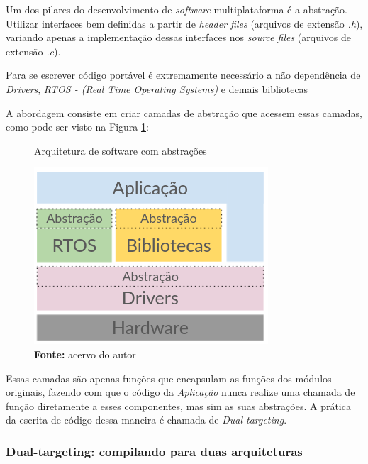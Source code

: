 \documentclass[times, twoside, watermark]{artigo}
\begin{document}
Um dos pilares do desenvolvimento de \textit{software} multiplataforma é a abstração.
Utilizar interfaces bem definidas a partir de \textit{header files} (arquivos de
extensão \textit{.h}), variando apenas a implementação dessas interfaces nos
\textit{source files} (arquivos de extensão \textit{.c}).

Para se escrever código portável é extremamente necessário a não dependência de
\textit{Drivers}, \textit{RTOS - (Real Time Operating Systems)} e demais bibliotecas

A abordagem consiste em criar camadas de abstração que acessem essas camadas, como
pode ser visto na Figura \ref{fig:arch-abs}: \hfill\\

\begin{figure}[H]
  \centering
  \caption{Arquitetura de software com abstrações}
  \includegraphics[width=0.9\linewidth]{images/arch-abs.png}
  \caption*{\newline\textbf{Fonte:} acervo do autor}
  \label{fig:arch-abs}
\end{figure}

Essas camadas são apenas funções que encapsulam as funções dos módulos originais,
fazendo com que o código da \textit{Aplicação} nunca realize uma chamada de função
diretamente a esses componentes, mas sim as suas abstrações. A prática da escrita de código dessa maneira é chamada de \textit{Dual-targeting}.

\subsubsection{Dual-targeting: compilando para duas arquiteturas}\hfill\\
\end{document}

